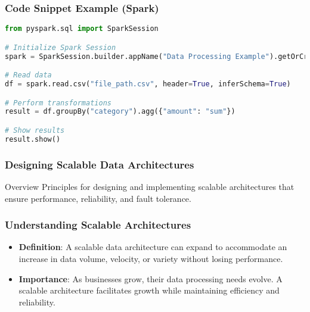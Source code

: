 \documentclass{beamer}
\begin{document}
\begin{frame}[fragile]
    \frametitle{Code Snippet Example (Spark)}
    \begin{lstlisting}[language=Python]
from pyspark.sql import SparkSession

# Initialize Spark Session
spark = SparkSession.builder.appName("Data Processing Example").getOrCreate()

# Read data
df = spark.read.csv("file_path.csv", header=True, inferSchema=True)

# Perform transformations
result = df.groupBy("category").agg({"amount": "sum"})

# Show results
result.show()
    \end{lstlisting}
\end{frame}

\begin{frame}[fragile]
    \frametitle{Designing Scalable Data Architectures}
    \begin{block}{Overview}
        Principles for designing and implementing scalable architectures that ensure performance, reliability, and fault tolerance.
    \end{block}
\end{frame}

\begin{frame}[fragile]
    \frametitle{Understanding Scalable Architectures}
    \begin{itemize}
        \item \textbf{Definition}: A scalable data architecture can expand to accommodate an increase in data volume, velocity, or variety without losing performance.
        \item \textbf{Importance}: As businesses grow, their data processing needs evolve. A scalable architecture facilitates growth while maintaining efficiency and reliability.
    \end{itemize}
\end{frame}
\end{document}
